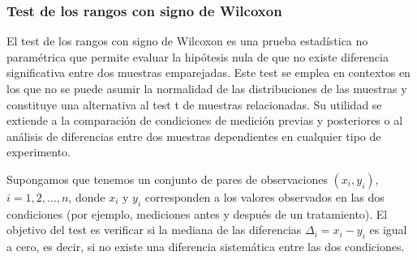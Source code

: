 \subsubsection{Test de los rangos con signo de Wilcoxon}\label{sec:tests}

El test de los rangos con signo de Wilcoxon \cite{Wilcoxon} es una prueba estadística no paramétrica que permite evaluar la hipótesis nula de que no existe diferencia significativa entre dos muestras emparejadas. Este test se emplea en contextos en los que no se puede asumir la normalidad de las distribuciones de las muestras y constituye una alternativa al test t de muestras relacionadas. Su utilidad se extiende a la comparación de condiciones de medición previas y posteriores o al análisis de diferencias entre dos muestras dependientes en cualquier tipo de experimento.

Supongamos que tenemos un conjunto de pares de observaciones $\left(x_i, y_i\right)$, $i = 1, 2, \dots, n$, donde $x_i$ y $y_i$ corresponden a los valores observados en las dos condiciones (por ejemplo, mediciones antes y después de un tratamiento). El objetivo del test es verificar si la mediana de las diferencias $\Delta_i = x_i - y_i$ es igual a cero, es decir, si no existe una diferencia sistemática entre las dos condiciones.


